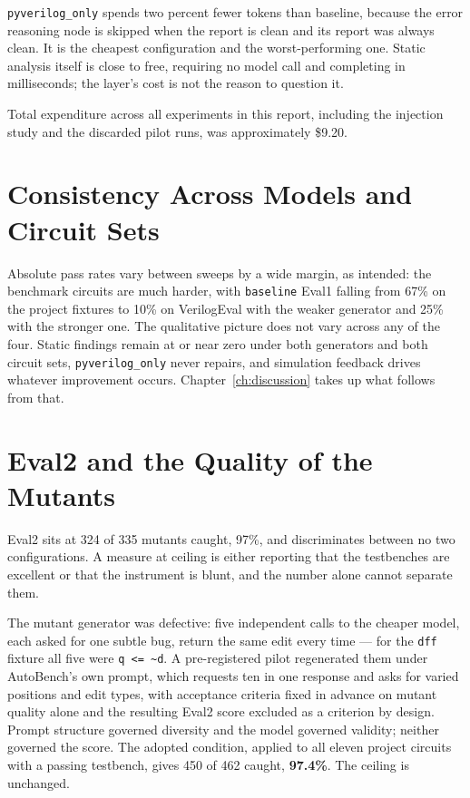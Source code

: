 \documentclass[11pt,a4paper,titlepage=false]{scrreprt}
\begin{document}
\texttt{pyverilog\_only} spends two percent fewer tokens than baseline, because the error
reasoning node is skipped when the report is clean and its report was always clean. It is
the cheapest configuration and the worst-performing one. Static analysis itself is close to
free, requiring no model call and completing in milliseconds; the layer's cost is not the
reason to question it.

Total expenditure across all experiments in this report, including the injection study and
the discarded pilot runs, was approximately \$9.20.

\section{Consistency Across Models and Circuit Sets}\label{sec:res-consistency}

Absolute pass rates vary between sweeps by a wide margin, as intended: the benchmark
circuits are much harder, with \texttt{baseline} Eval1 falling from 67\% on the project
fixtures to 10\% on VerilogEval with the weaker generator and 25\% with the stronger one. The
qualitative picture does not vary across any of the four. Static findings remain at or near
zero under both generators and both circuit sets, \texttt{pyverilog\_only} never repairs, and
simulation feedback drives whatever improvement occurs. Chapter~\ref{ch:discussion} takes up
what follows from that.

\section{Eval2 and the Quality of the Mutants}\label{sec:res-eval2}

Eval2 sits at 324 of 335 mutants caught, 97\%, and discriminates between no two
configurations. A measure at ceiling is either reporting that the testbenches are excellent
or that the instrument is blunt, and the number alone cannot separate them.

The mutant generator was defective: five independent calls to the cheaper model, each asked
for one subtle bug, return the same edit every time --- for the \texttt{dff} fixture all five
were \texttt{q <= \textasciitilde d}. A pre-registered pilot regenerated them under
AutoBench's own prompt, which requests ten in one response and asks for varied positions and
edit types, with acceptance criteria fixed in advance on mutant quality alone and the
resulting Eval2 score excluded as a criterion by design. Prompt structure governed diversity
and the model governed validity; neither governed the score. The adopted condition, applied
to all eleven project circuits with a passing testbench, gives 450 of 462 caught,
\textbf{97.4\%}. The ceiling is unchanged.
\end{document}
